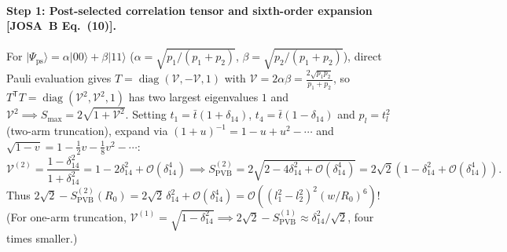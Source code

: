 \documentclass[10pt,letterpaper]{article}
\newcommand{\ket}[1]{\lvert #1 \rangle}
\newcommand{\josb}[1]{\textbf{[JOSA~B Eq.~(#1)]}}
\numberwithin{equation}{section}
\begin{document}
\paragraph*{Step 1: Post-selected correlation tensor and sixth-order expansion \josb{10}.}
For $\ket{\Psi_{\mathrm{ps}}} = \alpha\ket{00} + \beta\ket{11}$ ($\alpha = \sqrt{p_1/(p_1+p_2)}$, $\beta = \sqrt{p_2/(p_1+p_2)}$), direct Pauli evaluation gives $T = \operatorname{diag}(\mathcal{V}, -\mathcal{V}, 1)$ with $\mathcal{V} = 2\alpha\beta = \frac{2\sqrt{p_1 p_2}}{p_1+p_2}$, so $T^{\mathsf{T}}T = \operatorname{diag}(\mathcal{V}^2, \mathcal{V}^2, 1)$ has two largest eigenvalues $1$ and $\mathcal{V}^2 \implies S_{\max} = 2\sqrt{1+\mathcal{V}^2}$. Setting $t_1 = \bar{t}(1+\delta_{14})$, $t_4 = \bar{t}(1-\delta_{14})$ and $p_l = t_l^2$ (two-arm truncation), expand via $(1+u)^{-1} = 1 - u + u^2 - \cdots$ and $\sqrt{1-v} = 1 - \frac{1}{2}v - \frac{1}{8}v^2 - \cdots$:
\begin{equation}
  \mathcal{V}^{(2)} = \frac{1 - \delta_{14}^2}{1 + \delta_{14}^2} = 1 - 2\delta_{14}^2 + \mathcal{O}(\delta_{14}^4)
  \implies S_{\mathrm{PVB}}^{(2)} = 2\sqrt{2 - 4\delta_{14}^2 + \mathcal{O}(\delta_{14}^4)} = 2\sqrt{2}\left(1 - \delta_{14}^2 + \mathcal{O}(\delta_{14}^4)\right).
\end{equation}
Thus $2\sqrt{2} - S_{\mathrm{PVB}}^{(2)}(R_0) = 2\sqrt{2}\,\delta_{14}^2 + \mathcal{O}(\delta_{14}^4) = \mathcal{O}((l_1^2-l_2^2)^2(w/R_0)^6)$! (For one-arm truncation, $\mathcal{V}^{(1)} = \sqrt{1-\delta_{14}^2} \implies 2\sqrt{2} - S_{\mathrm{PVB}}^{(1)} \approx \delta_{14}^2/\sqrt{2}$, four times smaller.)
\end{document}
